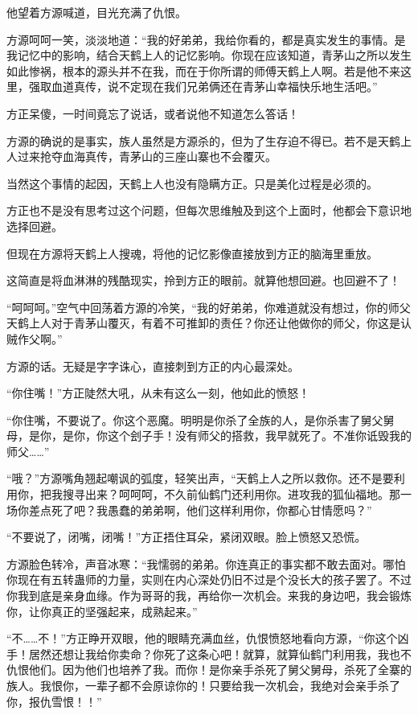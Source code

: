 \begin{this_body}
他望着方源喊道，目光充满了仇恨。

方源呵呵一笑，淡淡地道：“我的好弟弟，我给你看的，都是真实发生的事情。是我记忆中的影响，结合天鹤上人的记忆影响。你现在应该知道，青茅山之所以发生如此惨祸，根本的源头并不在我，而在于你所谓的师傅天鹤上人啊。若是他不来这里，强取血道真传，说不定现在我们兄弟俩还在青茅山幸福快乐地生活吧。”

方正呆傻，一时间竟忘了说话，或者说他不知道怎么答话！

方源的确说的是事实，族人虽然是方源杀的，但为了生存迫不得已。若不是天鹤上人过来抢夺血海真传，青茅山的三座山寨也不会覆灭。

当然这个事情的起因，天鹤上人也没有隐瞒方正。只是美化过程是必须的。

方正也不是没有思考过这个问题，但每次思维触及到这个上面时，他都会下意识地选择回避。

但现在方源将天鹤上人搜魂，将他的记忆影像直接放到方正的脑海里重放。

这简直是将血淋淋的残酷现实，拎到方正的眼前。就算他想回避。也回避不了！

“呵呵呵。”空气中回荡着方源的冷笑，“我的好弟弟，你难道就没有想过，你的师父天鹤上人对于青茅山覆灭，有着不可推卸的责任？你还让他做你的师父，你这是认贼作父啊。”

方源的话。无疑是字字诛心，直接刺到方正的内心最深处。

“你住嘴！”方正陡然大吼，从未有这么一刻，他如此的愤怒！

“你住嘴，不要说了。你这个恶魔。明明是你杀了全族的人，是你杀害了舅父舅母，是你，是你，你这个刽子手！没有师父的搭救，我早就死了。不准你诋毁我的师父……”

“哦？”方源嘴角翘起嘲讽的弧度，轻笑出声，“天鹤上人之所以救你。还不是要利用你，把我搜寻出来？呵呵呵，不久前仙鹤门还利用你。进攻我的狐仙福地。那一场你差点死了吧？我愚蠢的弟弟啊，他们这样利用你，你都心甘情愿吗？”

“不要说了，闭嘴，闭嘴！”方正捂住耳朵，紧闭双眼。脸上愤怒又恐慌。

方源脸色转冷，声音冰寒：“我懦弱的弟弟。你连真正的事实都不敢去面对。哪怕你现在有五转蛊师的力量，实则在内心深处仍旧不过是个没长大的孩子罢了。不过你我到底是亲身血缘。作为哥哥的我，再给你一次机会。来我的身边吧，我会锻炼你，让你真正的坚强起来，成熟起来。”

“不……不！”方正睁开双眼，他的眼睛充满血丝，仇恨愤怒地看向方源，“你这个凶手！居然还想让我给你卖命？你死了这条心吧！就算，就算仙鹤门利用我，我也不仇恨他们。因为他们也培养了我。而你！是你亲手杀死了舅父舅母，杀死了全寨的族人。我恨你，一辈子都不会原谅你的！只要给我一次机会，我绝对会亲手杀了你，报仇雪恨！！”


\end{this_body}
